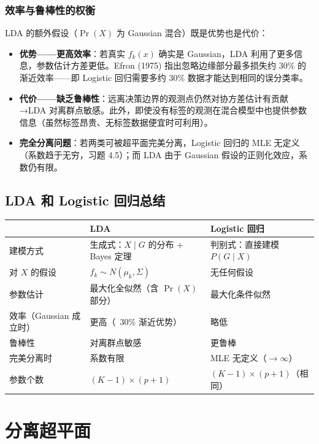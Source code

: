 \subsubsection{效率与鲁棒性的权衡}

LDA 的额外假设（$\Pr(X)$ 为 Gaussian 混合）既是优势也是代价：
\begin{itemize}
    \item \textbf{优势——更高效率}：若真实 $f_k(x)$ 确实是 Gaussian，LDA 利用了更多信息，参数估计方差更低。Efron (1975) 指出忽略边缘部分最多损失约 30\% 的渐近效率——即 Logistic 回归需要多约 30\% 数据才能达到相同的误分类率。
    \item \textbf{代价——缺乏鲁棒性}：远离决策边界的观测点仍然对协方差估计有贡献→LDA 对离群点敏感。此外，即使没有标签的观测在混合模型中也提供参数信息（虽然标签昂贵、无标签数据便宜时可利用）。
    \item \textbf{完全分离问题}：若两类可被超平面完美分离，Logistic 回归的 MLE 无定义（系数趋于无穷，习题 4.5）；而 LDA 由于 Gaussian 假设的正则化效应，系数仍有限。
\end{itemize}

\subsection{LDA 和 Logistic 回归总结}

\begin{center}
\begin{tabular}{lll}
\toprule
& LDA & Logistic 回归 \\
\midrule
建模方式 & 生成式：$X\mid G$ 的分布 + Bayes 定理 & 判别式：直接建模 $P(G\mid X)$ \\
对 $X$ 的假设 & $f_k \sim N(\mu_k, \Sigma)$ & 无任何假设 \\
参数估计 & 最大化全似然（含 $\Pr(X)$ 部分） & 最大化条件似然 \\
效率（Gaussian 成立时） & 更高（~30\% 渐近优势） & 略低 \\
鲁棒性 & 对离群点敏感 & 更鲁棒 \\
完美分离时 & 系数有限 & MLE 无定义（$\to\infty$） \\
参数个数 & $(K-1)\times(p+1)$ & $(K-1)\times(p+1)$（相同） \\
\bottomrule
\end{tabular}
\end{center}


\section{分离超平面}

